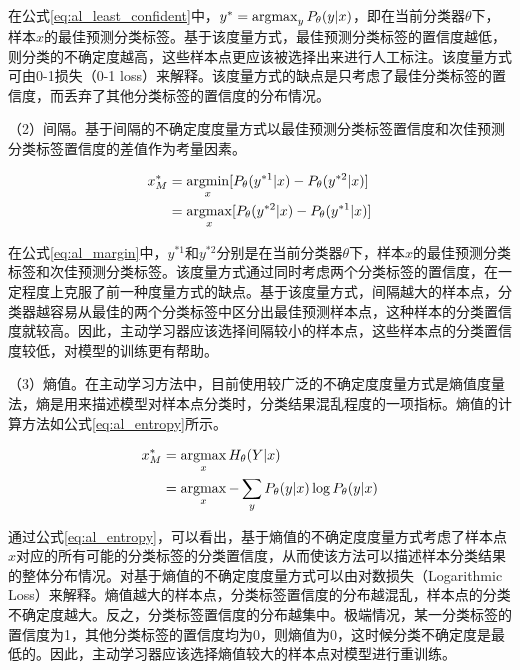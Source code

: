 在公式\ref{eq:al_least_confident}中，$y^*=\operatorname*{argmax}_y P_\theta (y|x)$，即在当前分类器$\theta$下，样本$x$的最佳预测分类标签。基于该度量方式，最佳预测分类标签的置信度越低，则分类的不确定度越高，这些样本点更应该被选择出来进行人工标注。该度量方式可由0-1损失（0-1 loss）来解释。该度量方式的缺点是只考虑了最佳分类标签的置信度，而丢弃了其他分类标签的置信度的分布情况。

（2）间隔。基于间隔的不确定度度量方式以最佳预测分类标签置信度和次佳预测分类标签置信度的差值作为考量因素。

\begin{align}\label{eq:al_margin}
\begin{aligned}
x_M^*&=\operatorname*{argmin}_x [P_\theta(y^{*1}|x)-P_\theta(y^{*2}|x)]\\
&=\operatorname*{argmax}_x [P_\theta(y^{*2}|x)-P_\theta(y^{*1}|x)]
\end{aligned}
\end{align}

在公式\ref{eq:al_margin}中，$y^{*1}$和$y^{*2}$分别是在当前分类器$\theta$下，样本$x$的最佳预测分类标签和次佳预测分类标签。该度量方式通过同时考虑两个分类标签的置信度，在一定程度上克服了前一种度量方式的缺点。基于该度量方式，间隔越大的样本点，分类器越容易从最佳的两个分类标签中区分出最佳预测样本点，这种样本的分类置信度就较高。因此，主动学习器应该选择间隔较小的样本点，这些样本点的分类置信度较低，对模型的训练更有帮助。

（3）熵值。在主动学习方法中，目前使用较广泛的不确定度度量方式是熵值度量法，熵是用来描述模型对样本点分类时，分类结果混乱程度的一项指标。熵值的计算方法如公式\ref{eq:al_entropy}所示。

\begin{align}\label{eq:al_entropy}
\begin{aligned}
x_M^*&=\operatorname*{argmax}_x H_\theta (Y|x)\\
&=\operatorname*{argmax}_x -\sum_{y}P_\theta(y|x)\log P_\theta(y|x)
\end{aligned}
\end{align}

通过公式\ref{eq:al_entropy}，可以看出，基于熵值的不确定度度量方式考虑了样本点$x$对应的所有可能的分类标签的分类置信度，从而使该方法可以描述样本分类结果的整体分布情况。对基于熵值的不确定度度量方式可以由对数损失（Logarithmic Loss）来解释。熵值越大的样本点，分类标签置信度的分布越混乱，样本点的分类不确定度越大。反之，分类标签置信度的分布越集中。极端情况，某一分类标签的置信度为1，其他分类标签的置信度均为0，则熵值为0，这时候分类不确定度是最低的。因此，主动学习器应该选择熵值较大的样本点对模型进行重训练。

